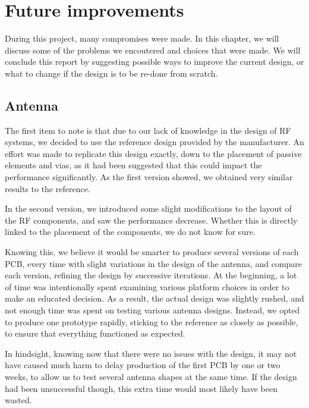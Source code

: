 \chapter{Future improvements}\label{ch:improvements}

During this project, many compromises were made. In this chapter, we will
discuss some of the problems we encoutered and choices that were made. We will
conclude this report by suggesting possible ways to improve the current design,
or what to change if the design is to be re-done from scratch.

\section{Antenna}

The first item to note is that due to our lack of knowledge in the design of RF
systems, we decided to use the reference design provided by the manufacturer. An
effort was made to replicate this design exactly, down to the placement of
passive elements and vias, as it had been suggested that this could impact the
performance significantly. As the first version showed, we obtained very similar
results to the reference.

In the second version, we introduced some slight modifications to the layout of
the RF components, and saw the performance decrease. Whether this is directly
linked to the placement of the components, we do not know for sure.

Knowing this, we believe it would be smarter to produce several versions of each
PCB, every time with slight variations in the design of the antenna, and compare
each version, refining the design by successive iterations. At the beginning,
a lot of time was intentionally spent examining various platform choices in
order to make an educated decision. As a result, the actual design was slightly
rushed, and not enough time was spent on testing various antenna designs.
Instead, we opted to produce one prototype rapidly, sticking to the reference as
closely as possible, to ensure that everything functioned as expected.

In hindsight, knowing now that there were no issues with the design, it may not
have caused much harm to delay production of the first PCB by one or two weeks,
to allow us to test several antenna shapes at the same time. If the design had
been unsuccessful though, this extra time would most likely have been wasted.



